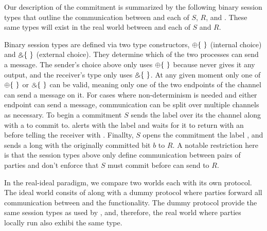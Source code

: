 Our description of the commitment is summarized by the following binary session types that outline the communication between \Fcom and each of $S$, $R$, and \A.
These same types will exist in the real world between \Z and each of $S$ and $R$.


Binary session types are defined via two type constructors, $\ichoice$ (internal choice) and $\echoice$ (external choice). 
They determine which of the two processes can send a message.
The sender's choice above only uses $\ichoice$ because \Fcom never gives it any output, and the receiver's type only uses $\echoice$.
At any given moment only one of $\ichoice$ or $\echoice$ can be valid, meaning only one of the two endpoints of the channel can send a message on it.
For cases where non-determinism is needed and either endpoint can send a message, communication can be split over multiple channels as necessary.
To begin a commitment $S$ sends the label  over its the channel along with a  to commit to.
\Fcom alerts \A with the label  and waits for it to return with an  before telling the receiver with .
Finallty, $S$ opens the commitment the label , and \Fcom sends  a long with the originally committed bit $b$ to $R$.
A notable restriction here is that the session types above only define communication between pairs of parties and don't enforce that $S$ must commit before \Fcom can send  to $R$.

In the real-ideal paradigm, we compare two worlds each with its own protocol.
The ideal world consits of \Fcom along with a dummy protocol where parties forward all communication between \Z and the functionality.
The dummy protocol provide the same session types as used by \Fcom, and, therefore, the real world where parties locally run \protcom also exhibi the same type.

